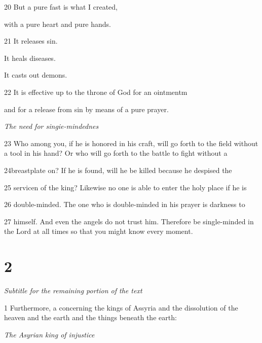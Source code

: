\par 20 But a pure fast is what I created,

\par with a pure heart and pure hands.

\par 21 It releases sin.

\par It heals diseases.

\par It casts out demons.

\par 22 It is effective up to the throne of God for an ointmentm

\par and for a release from sin by means of a pure prayer.

\par \textit{The need for singie-mindednes}

\par 23 Who among you, if he is honored in his craft, will go forth to the field without a tool in his hand? Or who will go forth to the battle to fight without a 

\par 24breastplate on? If he is found, will he be killed because he despised the

\par 25 servicen of the king? Likewise no one is able to enter the holy place if he is

\par 26 double-minded. The one who is double-minded in his prayer is darkness to

\par 27 himself. And even the angels do not trust him. Therefore be single-minded in the Lord at all times so that you might know every moment.

\chapter{2}

\par \textit{Subtitle for the remaining portion of the text}

\par 1 Furthermore, a concerning the kings of Assyria and the dissolution of the heaven and the earth and the things beneath the earth:

\par \textit{The Asyrian king of injustice}

